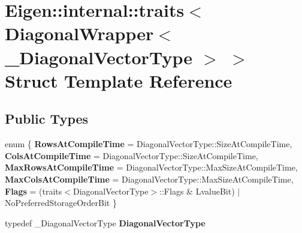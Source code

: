 \hypertarget{struct_eigen_1_1internal_1_1traits_3_01_diagonal_wrapper_3_01___diagonal_vector_type_01_4_01_4}{}\section{Eigen\+::internal\+::traits$<$ Diagonal\+Wrapper$<$ \+\_\+\+Diagonal\+Vector\+Type $>$ $>$ Struct Template Reference}
\label{struct_eigen_1_1internal_1_1traits_3_01_diagonal_wrapper_3_01___diagonal_vector_type_01_4_01_4}
\subsection*{Public Types}
\begin{DoxyCompactItemize}
\item 
\mbox{\label{struct_eigen_1_1internal_1_1traits_3_01_diagonal_wrapper_3_01___diagonal_vector_type_01_4_01_4_ab97e26fc4d51a2f7f563c8ac98b77473}} 
enum \{ \newline
{\bfseries Rows\+At\+Compile\+Time} = Diagonal\+Vector\+Type\+::Size\+At\+Compile\+Time, 
{\bfseries Cols\+At\+Compile\+Time} = Diagonal\+Vector\+Type\+::Size\+At\+Compile\+Time, 
{\bfseries Max\+Rows\+At\+Compile\+Time} = Diagonal\+Vector\+Type\+::Max\+Size\+At\+Compile\+Time, 
{\bfseries Max\+Cols\+At\+Compile\+Time} = Diagonal\+Vector\+Type\+::Max\+Size\+At\+Compile\+Time, 
\newline
{\bfseries Flags} = (traits$<$Diagonal\+Vector\+Type$>$\+::Flags \& Lvalue\+Bit) $\vert$ No\+Preferred\+Storage\+Order\+Bit
 \}
\item 
\mbox{\label{struct_eigen_1_1internal_1_1traits_3_01_diagonal_wrapper_3_01___diagonal_vector_type_01_4_01_4_a89ad48a2edbce9615060580cd8a8dc7e}} 
typedef \+\_\+\+Diagonal\+Vector\+Type {\bfseries Diagonal\+Vector\+Type}
\item 
\mbox{\label{struct_eigen_1_1internal_1_1traits_3_01_diagonal_wrapper_3_01___diagonal_vector_type_01_4_01_4_a7ac8c5f89e88d54b8a5dd3595e572095}} 

\end{DoxyCompactItemize}
